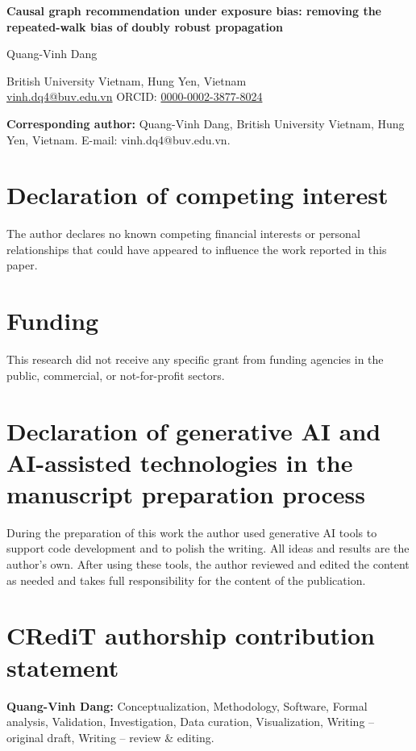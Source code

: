 \documentclass[12pt]{article}
\begin{document}
\begin{center}
{\Large\bfseries Causal graph recommendation under exposure bias: removing the repeated-walk bias of doubly robust propagation\par}
\vspace{1.5em}
{\large Quang-Vinh Dang\par}
\vspace{0.5em}
British University Vietnam, Hung Yen, Vietnam\\
\href{mailto:vinh.dq4@buv.edu.vn}{vinh.dq4@buv.edu.vn} \quad
ORCID: \href{https://orcid.org/0000-0002-3877-8024}{0000-0002-3877-8024}
\end{center}

\vspace{1em}
\noindent\textbf{Corresponding author:} Quang-Vinh Dang, British University Vietnam,
Hung Yen, Vietnam. E-mail: vinh.dq4@buv.edu.vn.

\section*{Declaration of competing interest}
The author declares no known competing financial interests or personal
relationships that could have appeared to influence the work reported in this paper.

\section*{Funding}
This research did not receive any specific grant from funding agencies in the
public, commercial, or not-for-profit sectors.

\section*{Declaration of generative AI and AI-assisted technologies in the manuscript preparation process}
During the preparation of this work the author used generative AI tools to
support code development and to polish the writing. All ideas and results are
the author's own. After using these tools, the author reviewed and edited the
content as needed and takes full responsibility for the content of the
publication.

\section*{CRediT authorship contribution statement}
\textbf{Quang-Vinh Dang:} Conceptualization, Methodology, Software, Formal analysis,
Validation, Investigation, Data curation, Visualization, Writing -- original draft,
Writing -- review \& editing.
\end{document}
